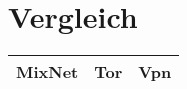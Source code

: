 \section{Vergleich}
\begin{tabular}{|c|c|c|}
    \hline
    MixNet & Tor & Vpn \\
    \hline
\end{tabular}